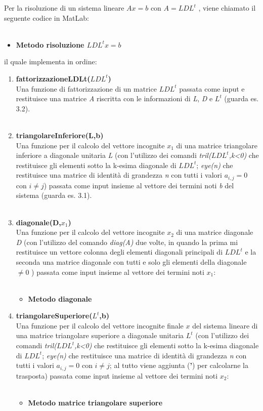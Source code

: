 Per la risoluzione di un sistema lineare $Ax=b$ con $A=LDL^t$ , viene chiamato il seguente codice in MatLab:\\\
\begin{itemize}
	\item \textbf{Metodo risoluzione $LDL^tx=b$}
		
\end{itemize}
il quale implementa in ordine:
\begin{enumerate}
	\item \textbf{fattorizzazioneLDLt($LDL^t$)}\\
		Una funzione di fattorizzazione di un matrice $LDL^t$ passata come input e restituisce una matrice \textit{A} riscritta con le informazioni di \textit{L}, \textit{D} e $L^t$ (guarda es. 3.2).\\\
	\item \textbf{triangolareInferiore(L,b)}\\
		Una funzione per il calcolo del vettore incognite $x_1$ di una matrice triangolare inferiore a diagonale unitaria \textit{L} (con l'utilizzo dei comandi \textit{tril($LDL^t$,k<0)} che restituisce gli elementi sotto la k-esima diagonale di $LDL^t$; \textit{eye(n)} che restituisce una matrice di identità di grandezza \textit{n} con tutti i valori $a_{i,j}=0$ con $i \neq j$) passata come input insieme al vettore dei termini noti \textit{b} del sistema (guarda es. 3.1). \\\
	\item \textbf{diagonale(D,$x_1$)}\\
		Una funzione per il calcolo del vettore incognite $x_2$ di una matrice diagonale \textit{D} (con l'utilizzo del comando \textit{diag(A)} due volte, in quando la prima mi restituisce un vettore colonna degli elementi diagonali principali di $LDL^t$ e la seconda una matrice diagonale con tutti e solo gli elementi della diagonale $\neq 0$ ) passata come input insieme al vettore dei termini noti $x_1$:\\\
\begin{itemize}
	\item \textbf{Metodo diagonale}
		
\end{itemize}
	\item \textbf{triangolareSuperiore($L^t$,b)}\\
		Una funzione per il calcolo del vettore incognite finale $x$ del sistema lineare di una matrice triangolare superiore a diagonale unitaria \textit{$L^t$} (con l'utilizzo dei comandi \textit{tril($LDL^t$,k<0)} che restituisce gli elementi sotto la k-esima diagonale di $LDL^t$; \textit{eye(n)} che restituisce una matrice di identità di grandezza \textit{n} con tutti i valori $a_{i,j}=0$ con $i \neq j$; al tutto viene aggiunta (\textbf{'}) per calcolarne la trasposta) passata come input insieme al vettore dei termini noti $x_2$:\\\
\begin{itemize}
	\item \textbf{Metodo matrice triangolare superiore}
		
\end{itemize}
\end{enumerate}